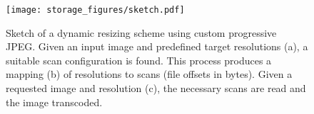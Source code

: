 \begin{figure}
\texttt{[image: storage\_figures/sketch.pdf]}
\caption{Sketch of a dynamic resizing scheme using custom progressive JPEG\@. 
Given an input image and predefined target resolutions (a), a suitable scan configuration is found.
This process produces a mapping (b) of resolutions to scans (file offsets in bytes).
Given a requested image and resolution (c), the necessary scans are read and the image transcoded. 
}
\label{fig:sketch}
\end{figure}
